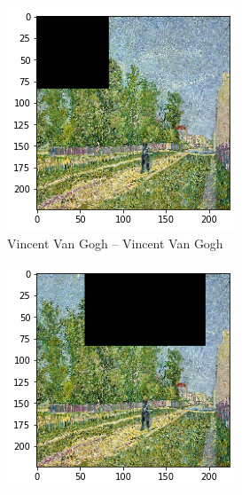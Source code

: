 \begin{figure}[H]
	\begin{subfigure}{0.5\textwidth}
		\includegraphics[width=0.9\linewidth]{img/scratch/visualization/occlusion_mask_1.png} 
		\caption{Vincent Van Gogh -- Vincent Van Gogh}
		\label{fig:oc_mask_1}
	\end{subfigure}
	\begin{subfigure}{0.5\textwidth}
		\includegraphics[width=0.9\linewidth]{img/scratch/visualization/occlusion_mask_2.png} 

\end{subfigure}
\end{figure}
